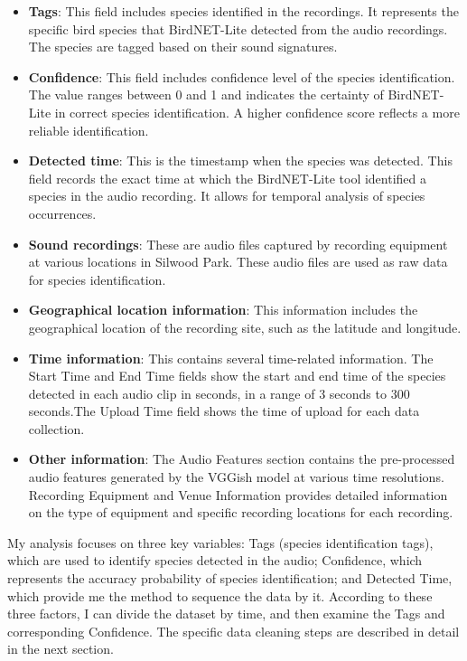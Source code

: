 \documentclass[a4paper,12pt]{article}
\begin{document}
\begin{itemize}
    \item \textbf{Tags}: This field includes species identified in the recordings. It represents the specific bird species that BirdNET-Lite detected from the audio recordings. The species are tagged based on their sound signatures.
    
    \item \textbf{Confidence}: This field includes confidence level of the species identification. The value ranges between 0 and 1 and indicates the certainty of BirdNET-Lite in correct species identification. A higher confidence score reflects a more reliable identification.
    
    \item \textbf{Detected time}: This is the timestamp when the species was detected. This field records the exact time at which the BirdNET-Lite tool identified a species in the audio recording. It allows for temporal analysis of species occurrences.
    
    \item \textbf{Sound recordings}: These are audio files captured by recording equipment at various locations in Silwood Park. These audio files are used as raw data for species identification.
    
    \item \textbf{Geographical location information}: This information includes the geographical location of the recording site, such as the latitude and longitude.
    
    \item \textbf{Time information}: This contains several time-related information. The Start Time and End Time fields show the start and end time of the species detected in each audio clip in seconds, in a range of 3 seconds to 300 seconds.The Upload Time field shows the time of upload for each data collection.
    
    \item \textbf{Other information}: The Audio Features section contains the pre-processed audio features generated by the VGGish model at various time resolutions. Recording Equipment and Venue Information provides detailed information on the type of equipment and specific recording locations for each recording.
\end{itemize}

My analysis focuses on three key variables: Tags (species identification tags), which are used to identify species detected in the audio; Confidence, which represents the accuracy probability of species identification; and Detected Time, which provide me the method to sequence the data by it. According to these three factors, I can divide the dataset by time, and then examine the Tags and corresponding Confidence. The specific data cleaning steps are described in detail in the next section.
\end{document}
